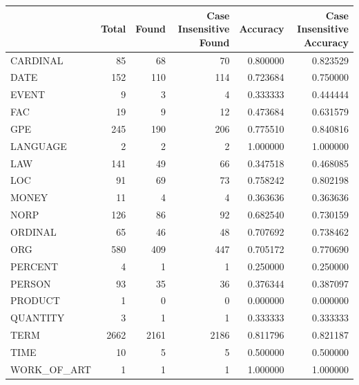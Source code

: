 \begin{tabular}{lrrrrr}
\toprule
 & Total & Found & Case Insensitive Found & Accuracy & Case Insensitive Accuracy \\
\midrule
CARDINAL & 85 & 68 & 70 & 0.800000 & 0.823529 \\
DATE & 152 & 110 & 114 & 0.723684 & 0.750000 \\
EVENT & 9 & 3 & 4 & 0.333333 & 0.444444 \\
FAC & 19 & 9 & 12 & 0.473684 & 0.631579 \\
GPE & 245 & 190 & 206 & 0.775510 & 0.840816 \\
LANGUAGE & 2 & 2 & 2 & 1.000000 & 1.000000 \\
LAW & 141 & 49 & 66 & 0.347518 & 0.468085 \\
LOC & 91 & 69 & 73 & 0.758242 & 0.802198 \\
MONEY & 11 & 4 & 4 & 0.363636 & 0.363636 \\
NORP & 126 & 86 & 92 & 0.682540 & 0.730159 \\
ORDINAL & 65 & 46 & 48 & 0.707692 & 0.738462 \\
ORG & 580 & 409 & 447 & 0.705172 & 0.770690 \\
PERCENT & 4 & 1 & 1 & 0.250000 & 0.250000 \\
PERSON & 93 & 35 & 36 & 0.376344 & 0.387097 \\
PRODUCT & 1 & 0 & 0 & 0.000000 & 0.000000 \\
QUANTITY & 3 & 1 & 1 & 0.333333 & 0.333333 \\
TERM & 2662 & 2161 & 2186 & 0.811796 & 0.821187 \\
TIME & 10 & 5 & 5 & 0.500000 & 0.500000 \\
WORK_OF_ART & 1 & 1 & 1 & 1.000000 & 1.000000 \\
\bottomrule
\end{tabular}
